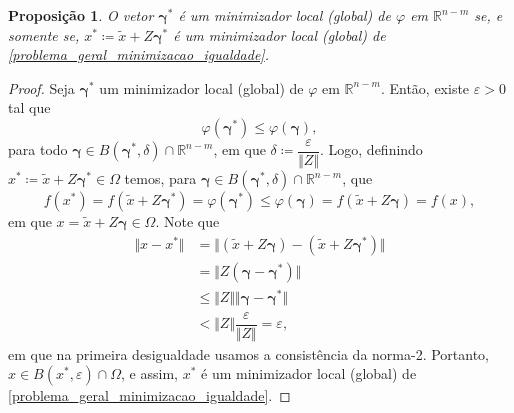 \documentclass[12pt,a4paper]{scrartcl}
\def\RR{\mathds{R}}
\newtheorem{prop}{Proposição}
\theoremstyle{definition}%
\begin{document}
\begin{prop} \label{prop:equivalencia_problema_restricoes_igualdade_irrestrito}
O vetor $\boldsymbol{\gamma}^{*}$ é um minimizador local (global) de $\varphi$ em $\RR^{n-m}$ se, e somente se, $x^{*} \coloneqq  \tilde{x} + Z\boldsymbol{\gamma}^{*}$ é um minimizador local (global) de \eqref{problema_geral_minimizacao_igualdade}.
\end{prop}
\begin{proof}
Seja $\boldsymbol{\gamma}^{*}$ um minimizador local (global) de $\varphi$ em $\RR^{n-m}$. Então, existe $\varepsilon >0$ tal que
\[
\varphi (\boldsymbol{\gamma}^{*}) \leq \varphi (\boldsymbol{\gamma}) ,
\]
para todo $\boldsymbol{\gamma} \in B( \boldsymbol{\gamma}^{*} , \delta ) \cap \RR^{n-m}$, em que $\delta \coloneqq \dfrac{\varepsilon}{\Vert Z \Vert}$. Logo, definindo $x^{*}\coloneqq \tilde{x} + Z\boldsymbol{\gamma}^{*} \in \Omega$ temos, para $\boldsymbol{\gamma} \in B( \boldsymbol{\gamma}^{*} , \delta ) \cap \RR^{n-m}$, que
\[
 f(x^{*}) = f(\tilde{x} + Z\boldsymbol{\gamma}^{*} ) = \varphi (\boldsymbol{\gamma}^{*}) \leq \varphi (\boldsymbol{\gamma}) = f(\tilde{x} + Z\boldsymbol{\gamma}) = f(x) ,
\]
em que $x = \tilde{x} + Z\boldsymbol{\gamma} \in \Omega$. Note que
\[
\begin{aligned}
\Vert x-x^{*} \Vert &= \Vert (\tilde{x} + Z\boldsymbol{\gamma}) - (\tilde{x} + Z\boldsymbol{\gamma}^{*}) \Vert \\
&= \Vert Z(\boldsymbol{\gamma} - \boldsymbol{\gamma}^{*} )\Vert \\
&\leq \Vert Z\Vert \Vert \boldsymbol{\gamma} - \boldsymbol{\gamma}^{*} \Vert \label{eq:teste} \\
&< \Vert Z\Vert \dfrac{\varepsilon}{\Vert Z \Vert} = \varepsilon , 
\end{aligned}
\]
em que na primeira desigualdade usamos a consistência da norma-2. Portanto, $x\in B(x^{*}, \varepsilon ) \cap \Omega$, e assim,  $x^{*}$ é um minimizador local (global) de \eqref{problema_geral_minimizacao_igualdade}.


\end{proof}
\end{document}
